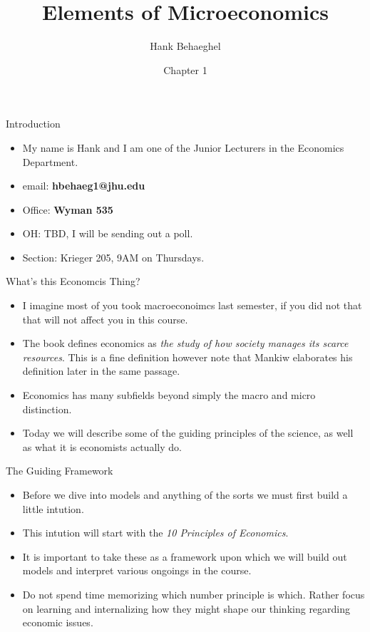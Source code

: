 \documentclass[aspectratio=169]{beamer}
\title{Elements of Microeconomics}
\author{Hank Behaeghel}
\institute{Johns Hopkins University}
\date{Chapter 1}
\begin{document}
\maketitle

\begin{frame}{Introduction}
    \begin{itemize}
        \item My name is Hank and I am one of the Junior Lecturers in the Economics Department.
        \item email: \textbf{hbehaeg1@jhu.edu}
        \item Office: \textbf{Wyman 535}
        \item OH: TBD, I will be sending out a poll.
        \item Section: Krieger 205, 9AM on Thursdays.
    \end{itemize}
\end{frame}

\begin{frame}{What's this Economcis Thing?}
    \begin{itemize}
        \item I imagine most of you took macroeconoimcs last semester, if you did not that that will not affect you in this course. 
        \item The book defines economics as \textit{the study of how society manages its scarce resources}. This is a fine definition however note that Mankiw elaborates
        his definition later in the same passage.
        \item Economics has many subfields beyond simply the macro and micro distinction.
        \item Today we will describe some of the guiding principles of the science, as well as what it is economists actually do.
    \end{itemize}

\end{frame}

\begin{frame}{The Guiding Framework}
    \begin{itemize}
        \item Before we dive into models and anything of the sorts we must first build a little intution.
        \item This intution will start with the \textit{10 Principles of Economics}. 
        \item It is important to take these as a framework upon which we will build out models and interpret various ongoings in the course.
        \item Do not spend time memorizing which number principle is which. Rather focus on learning and internalizing how they might shape our thinking regarding economic issues.
    \end{itemize}
\end{frame}
\end{document}
